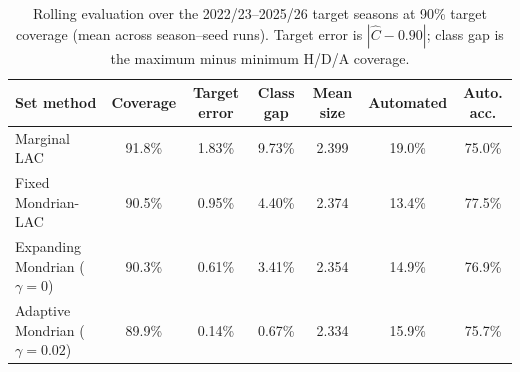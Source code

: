 \begin{table}[tbp]
\centering
\footnotesize
\setlength{\tabcolsep}{5pt}
\caption{Rolling evaluation over the 2022/23--2025/26 target seasons at 90\% target coverage (mean across season--seed runs). Target error is $|\widehat{C}-0.90|$; class gap is the maximum minus minimum H/D/A coverage.}
\label{tab:conformal-rolling}
\begin{tabular}{lcccccc}
\toprule
Set method & Coverage & Target error & Class gap & Mean size & Automated & Auto. acc. \\
\midrule
Marginal LAC & 91.8\% & 1.83\% & 9.73\% & 2.399 & 19.0\% & 75.0\% \\
Fixed Mondrian-LAC & 90.5\% & 0.95\% & 4.40\% & 2.374 & 13.4\% & 77.5\% \\
Expanding Mondrian ($\gamma=0$) & 90.3\% & 0.61\% & 3.41\% & 2.354 & 14.9\% & 76.9\% \\
Adaptive Mondrian ($\gamma=0.02$) & 89.9\% & 0.14\% & 0.67\% & 2.334 & 15.9\% & 75.7\% \\
\bottomrule
\end{tabular}
\end{table}
